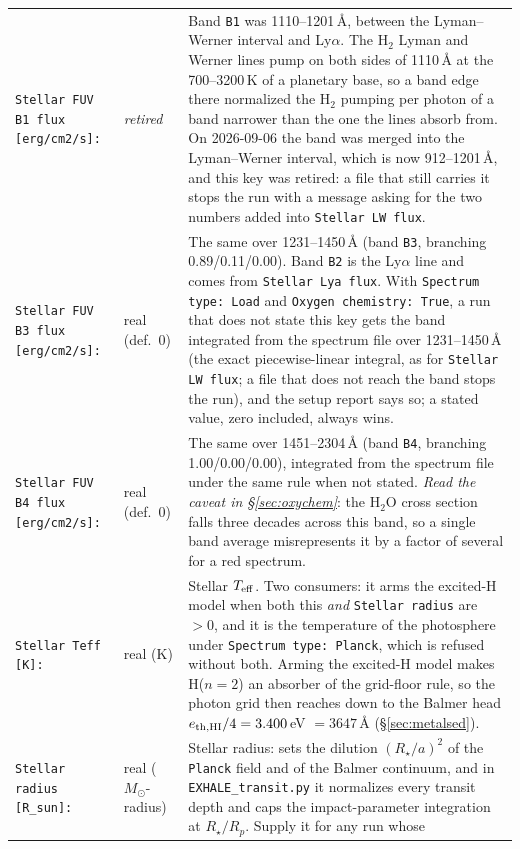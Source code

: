 \documentclass[english,a4paper]{my_memo}
\newcommand{\msun}{$M_\odot$}
\begin{document}
\begin{longtable}{@{}p{}p{}p{}@{}}
\texttt{Stellar FUV B1 flux [erg/cm2/s]:} & \emph{retired} &
  Band \texttt{B1} was 1110--1201\,\AA, between the Lyman--Werner interval
  and Ly$\alpha$. The H$_2$ Lyman and Werner lines pump on both sides of
  1110\,\AA{} at the 700--3200\,K of a planetary base, so a band edge there
  normalized the H$_2$ pumping per photon of a band narrower than the one the
  lines absorb from. On 2026-09-06 the band was merged into the Lyman--Werner
  interval, which is now 912--1201\,\AA, and this key was retired: a file
  that still carries it stops the run with a message asking for the two
  numbers added into \texttt{Stellar LW flux}. \\
\texttt{Stellar FUV B3 flux [erg/cm2/s]:} & real (def.\ 0) & The same over
  1231--1450\,\AA{} (band \texttt{B3}, branching 0.89/0.11/0.00). Band
  \texttt{B2} is the Ly$\alpha$ line and comes from
  \texttt{Stellar Lya flux}. With \texttt{Spectrum type: Load} and
  \texttt{Oxygen chemistry: True}, a run that does not state this key gets
  the band integrated from the spectrum file over 1231--1450\,\AA{} (the
  exact piecewise-linear integral, as for \texttt{Stellar LW flux}; a file
  that does not reach the band stops the run), and the setup report says
  so; a stated value, zero included, always wins. \\
\texttt{Stellar FUV B4 flux [erg/cm2/s]:} & real (def.\ 0) & The same over
  1451--2304\,\AA{} (band \texttt{B4}, branching 1.00/0.00/0.00), integrated
  from the spectrum file under the same rule when not stated. \emph{Read
  the caveat in \S\ref{sec:oxychem}}: the H$_2$O cross section falls three
  decades across this band, so a single band average misrepresents it by a
  factor of several for a red spectrum. \\
\texttt{Stellar Teff [K]:} & real (K) & Stellar $T_{\rm eff}$. Two consumers:
  it arms the excited-H model when both this \emph{and} \texttt{Stellar radius}
  are $>0$, and it is the temperature of the photosphere under
  \texttt{Spectrum type: Planck}, which is refused without both. Arming the
  excited-H model makes H($n{=}2$) an absorber of the grid-floor rule, so the
  photon grid then reaches down to the Balmer head $e_{\rm th,HI}/4 =
  3.400$\,eV $=3647$\,\AA{} (\S\ref{sec:metalsed}). \\
\texttt{Stellar radius [R\_sun]:} & real (\msun-radius) & Stellar radius: sets
  the dilution $(R_\star/a)^2$ of the \texttt{Planck} field and of the
  Balmer continuum, and in
  \texttt{EXHALE\_transit.py} it normalizes every transit depth and caps the
  impact-parameter integration at $R_\star/R_p$. Supply it for any run whose

\end{longtable}
\end{document}
